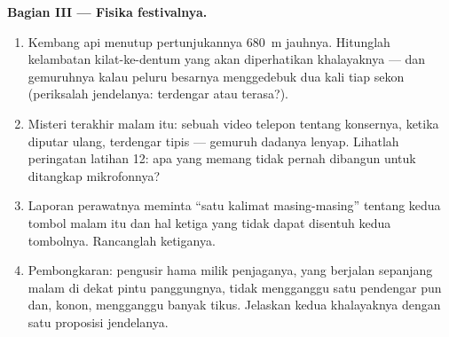 \begin{problem}
\medskip\noindent\textbf{Bagian III --- Fisika festivalnya.}
\begin{enumerate}[resume]
  \item Kembang api menutup pertunjukannya \qty{680}{m} jauhnya.
        Hitunglah kelambatan kilat-ke-dentum yang akan diperhatikan
        khalayaknya --- dan  gemuruhnya kalau peluru
        besarnya menggedebuk dua kali tiap sekon (periksalah
        jendelanya: terdengar atau terasa?).
  \item Misteri terakhir malam itu: sebuah video telepon tentang
        konsernya, ketika diputar ulang, terdengar tipis --- gemuruh
        dadanya lenyap. Lihatlah peringatan latihan 12: apa yang
        memang tidak pernah dibangun untuk ditangkap mikrofonnya?
  \item Laporan perawatnya meminta ``satu kalimat masing-masing''
        tentang kedua tombol malam itu dan hal ketiga yang tidak dapat
        disentuh kedua tombolnya. Rancanglah ketiganya.
  \item Pembongkaran: pengusir hama  milik penjaganya, yang
        berjalan sepanjang malam di dekat pintu panggungnya, tidak
        mengganggu satu pendengar pun dan, konon, mengganggu banyak
        tikus. Jelaskan kedua khalayaknya dengan satu proposisi
        jendelanya.
\end{enumerate}
\end{problem}
